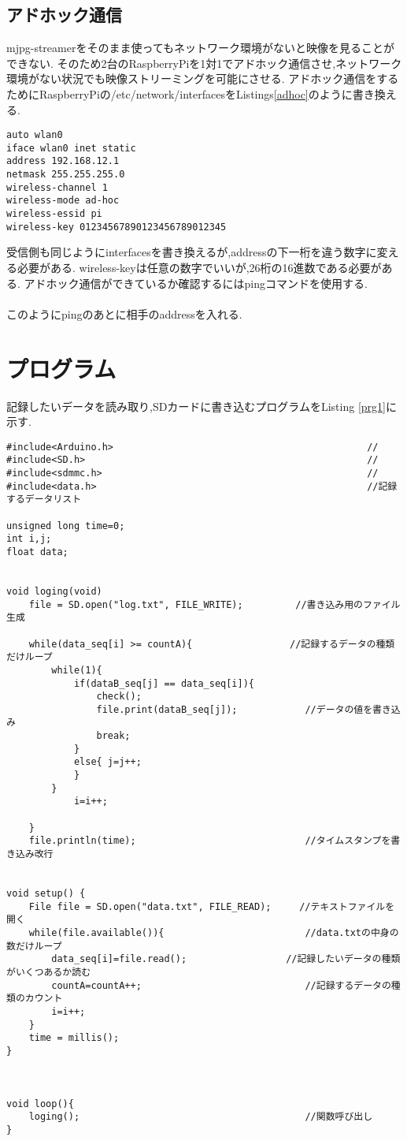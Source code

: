 \documentclass[12pt,oneside]{paper}
\begin{document}
\subsection{アドホック通信}
mjpg-streamerをそのまま使ってもネットワーク環境がないと映像を見ることができない.
そのため2台のRaspberryPiを1対1でアドホック通信させ,ネットワーク環境がない状況でも映像ストリーミングを可能にさせる.
アドホック通信をするためにRaspberryPiの/etc/network/interfacesをListings\ref{adhoc}のように書き換える.
\begin{lstlisting}[caption=interfaces,label=adhoc]
auto wlan0
iface wlan0 inet static 
address 192.168.12.1 
netmask 255.255.255.0 
wireless-channel 1 
wireless-mode ad-hoc 
wireless-essid pi 
wireless-key 01234567890123456789012345
\end{lstlisting}
受信側も同じようにinterfacesを書き換えるが,addressの下一桁を違う数字に変える必要がある.
wireless-keyは任意の数字でいいが,26桁の16進数である必要がある.
アドホック通信ができているか確認するにはpingコマンドを使用する.\\
\\
このようにpingのあとに相手のaddressを入れる.

\section{プログラム}

記録したいデータを読み取り,SDカードに書き込むプログラムをListing \ref{prg1}に示す.
\begin{lstlisting}[caption=ログProgram,label=prg1]
#include<Arduino.h>                                             //
#include<SD.h>                                                  //
#include<sdmmc.h>                                               //
#include<data.h>                                                //記録するデータリスト

unsigned long time=0;
int i,j;
float data;


void loging(void)
	file = SD.open("log.txt", FILE_WRITE);　　　　　 //書き込み用のファイル生成
	
	while(data_seq[i] >= countA){   　　　　　　　　 //記録するデータの種類だけループ
		while(1){
			if(dataB_seq[j] == data_seq[i]){
				check();
				file.print(dataB_seq[j]);            //データの値を書き込み
				break;
			}
			else{ j=j++;
			}
		}
			i=i++;

	}
	file.println(time);                              //タイムスタンプを書き込み改行


void setup() {
	File file = SD.open("data.txt", FILE_READ);　　　//テキストファイルを開く
	while(file.available()){                         //data.txtの中身の数だけループ
		data_seq[i]=file.read();　　　　　　　　　　 //記録したいデータの種類がいくつあるか読む
		countA=countA++;                             //記録するデータの種類のカウント
		i=i++;　　　　　　　　　　　　　　　　　　　
	}	
	time = millis();                                        
}



void loop(){
	loging();                                        //関数呼び出し
}


\end{lstlisting}
\end{document}
